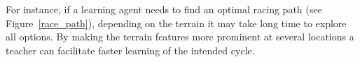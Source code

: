 \documentclass[letterpaper]{aamas2009}
\begin{document}
For instance, if a learning agent needs to find an optimal racing path
(see Figure~\ref{race_path}), depending on the terrain it may take long
time to explore all options. By making the terrain features more
prominent at several locations a teacher can facilitate faster
learning of the intended cycle.

\begin{figure*}[ht]
{\center 
{}
\\}
\caption{\label{race_path}Unmodified (passive) and augmented environment dynamics for race path finding (colours naturally encode traversability of the cell)}
\end{figure*}
\end{document}
